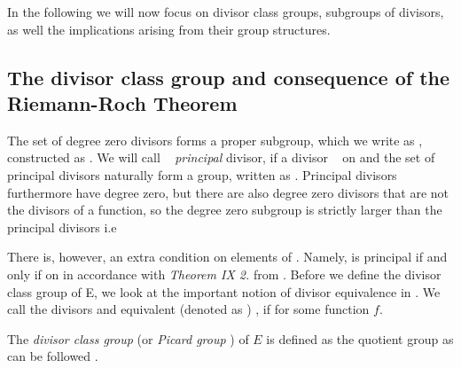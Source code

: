 In the following   we will now focus on divisor class groups, subgroups of divisors, as well the implications arising from their group structures.

\newpage

\subsection{The divisor class group and consequence of the Riemann-Roch Theorem}
\label{ssec:ch1.divisiors.classgroupandriemanroch}
The set of degree zero divisors forms a proper subgroup, which we write as , constructed as   .  We will call \mathFormulaDivisor~ \textit{principal} divisor, if a divisor \mathFormulaDivisor~ on  and the set of principal divisors naturally form a group, written as . Principal divisors furthermore have degree zero, but there are also degree zero divisors that are not the divisors of a function, so the degree zero subgroup is strictly larger than the principal divisors i.e 





There is, however, an extra condition on elements of . Namely,  is principal if and only if  on  in accordance with \textit{Theorem IX 2.} from \cite{Gal05}. Before we define the divisor class group of E, we look at the important notion
of divisor equivalence in . We call the divisors  and  equivalent (denoted as )
, if  for some function $f$. 

The \textit{divisor class group} (or  \textit{Picard group} ) of $E$ is defined as the quotient group  as can be followed .

